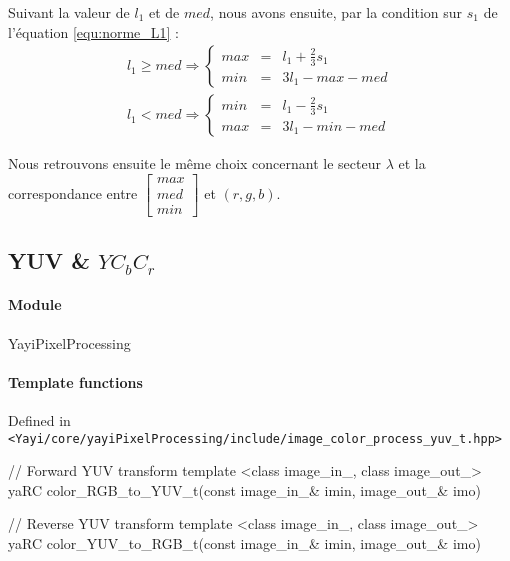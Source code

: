 Suivant la valeur de $l_1$ et de $med$, nous avons ensuite, par la condition sur $s_1$ de l'équation \ref{equ:norme_L1} :
\begin{equation}
	\begin{array}{l}
	l_1 \geq med \Rightarrow \left\{
		\begin{array}{lll}
				max & = & l_1 + \frac{2}{3}s_1\\
				min & = & 3 l_1 - max - med
		\end{array}
	\right. \\
	l_1 < med \Rightarrow \left\{
		\begin{array}{lll}
				min & = & l_1 - \frac{2}{3}s_1\\
				max & = & 3 l_1 - min - med
		\end{array}
	\right.
	\end{array}
\end{equation}

Nous retrouvons ensuite le même choix concernant le secteur $\lambda$ et la correspondance entre {\scriptsize $\left[\begin{array}{l}max\\ med\\ min \end{array}\right]$} et $(r,g,b)$. 

















\subsection{YUV \& $YC_bC_r$}



\paragraph{Module} YayiPixelProcessing

\paragraph{Template functions} Defined in \\
\lstinline|<Yayi/core/yayiPixelProcessing/include/image_color_process_yuv_t.hpp>|
\begin{cpp}
// Forward YUV transform
template <class image_in_, class image_out_>
yaRC color_RGB_to_YUV_t(const image_in_& imin, image_out_& imo)

// Reverse YUV transform
template <class image_in_, class image_out_>
yaRC color_YUV_to_RGB_t(const image_in_& imin, image_out_& imo)
\end{cpp}


